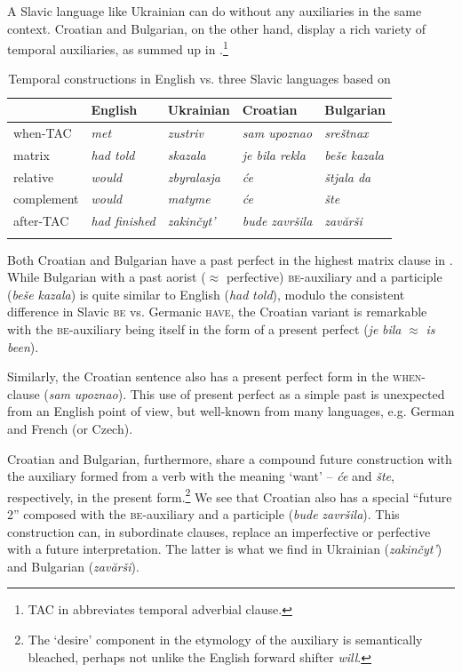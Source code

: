 \documentclass[output=paper,colorlinks,citecolor=brown]{langscibook}
\begin{document}
A Slavic language like Ukrainian  can do without any auxiliaries in the same context. Croatian and Bulgarian, on the other hand, display a rich variety of temporal auxiliaries, as summed up in .\footnote{TAC in  abbreviates temporal adverbial clause.}

\begin{table}
\caption{Temporal constructions in English vs. three Slavic languages based on }
\label{tab:aux}
 \begin{tabularx}{1\textwidth}{lXXXX} %
  \lsptoprule
           & English & Ukrainian & Croatian  & Bulgarian \\
  \midrule
  when-TAC   &   \textit{met}  &    \textit{zustriv}  &    \textit{sam upoznao}      & \textit{sreštnax}\\
  matrix  &   \textit{had told} &   \textit{skazala}  & \textit{je bila rekla}     & \textit{beše kazala}\\
  relative  & \textit{would}  & \textit{zbyralasja}  & \textit{će}  & \textit{štjala da}  \\ 
  complement & \textit{would}  & \textit{matyme} &  \textit{će}  &  \textit{šte}  \\
  after-TAC & \textit{had finished} & \textit{zakinčyt'} & \textit{bude završila} & \textit{zavărši} \\
  \lspbottomrule
 \end{tabularx}
\end{table}


Both Croatian and Bulgarian have a past perfect in the highest matrix clause in . While Bulgarian with a past aorist ($\approx$ perfective) \textsc{be}-auxiliary and a participle (\textit{beše} \textit{kazala}) is quite similar to English  (\textit{had} \textit{told}), modulo the consistent difference in Slavic \textsc{be} vs. Germanic \textsc{have}, the Croatian variant is remarkable with the \textsc{be}-auxiliary being itself in the form of a present perfect (\textit{je} \textit{bila} $\approx$ \textit{is} \textit{been}).

Similarly, the Croatian sentence also has a present perfect form in the \textsc{when}-clause (\textit{sam} \textit{upoznao}). This use of present perfect as a simple past is unexpected from an English point of view, but well-known from many languages, e.g. German and French (or Czech).

Croatian and Bulgarian, furthermore, share a compound future construction with the auxiliary formed from a verb with the meaning `want' -- \textit{će} and \textit{šte}, respectively, in the present form.\footnote{The `desire' component in the etymology of the auxiliary is semantically bleached, perhaps not unlike the English forward shifter \textit{will}.} We see that Croatian also has a special  ``future 2'' composed with the \textsc{be}-auxiliary and a participle (\textit{bude} \textit{završila}). This construction can, in subordinate clauses, replace an imperfective or perfective with a future interpretation. The latter is  what we find in Ukrainian (\textit{zakinčyt'}) and Bulgarian (\textit{zavărši}).
\end{document}
